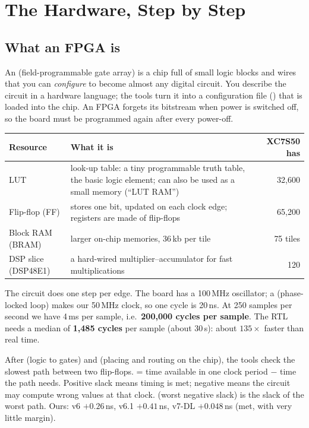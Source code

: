 \documentclass[11pt]{article}
\begin{document}
\section{The Hardware, Step by Step}
\label{sec:hw}

\subsection{What an FPGA is}
An  (field-programmable gate array) is a chip full of small logic blocks and wires that you can \emph{configure} to become almost any digital circuit. You describe the circuit in a hardware language; the tools turn it into a configuration file () that is loaded into the chip. An FPGA forgets its bitstream when power is switched off, so the board must be programmed again after every power-off.

\begin{center}
\small
\begin{tabularx}{\linewidth}{@{}l X r@{}}
\toprule
\textbf{Resource} & \textbf{What it is} & \textbf{XC7S50 has} \\
\midrule
LUT & look-up table: a tiny programmable truth table, the basic logic element; can also be used as a small memory (``LUT RAM'') & 32,600 \\
Flip-flop (FF) & stores one bit, updated on each clock edge; registers are made of flip-flops & 65,200 \\
Block RAM (BRAM) & larger on-chip memories, 36\,kb per tile & 75 tiles \\
DSP slice (DSP48E1) & a hard-wired multiplier--accumulator for fast multiplications & 120 \\
\bottomrule
\end{tabularx}
\end{center}

\begin{simple}
The circuit does one step per  edge. The board has a 100\,MHz oscillator; a  (phase-locked loop) makes our 50\,MHz clock, so one cycle is 20\,ns. At 250 samples per second we have 4\,ms per sample, i.e.\ \textbf{200,000 cycles per sample}. The RTL needs a median of \textbf{1,485 cycles} per sample (about 30\,\textmu s): about $135\times$ faster than real time.

After  (logic to gates) and  (placing and routing on the chip), the tools check the slowest path between two flip-flops.  = time available in one clock period $-$ time the path needs. Positive slack means timing is met; negative means the circuit may compute wrong values at that clock.  (worst negative slack) is the slack of the worst path. Ours: v6 $+0.26$\,ns, v6.1 $+0.41$\,ns, v7-DL $+0.048$\,ns (met, with very little margin).
\end{simple}
\end{document}
